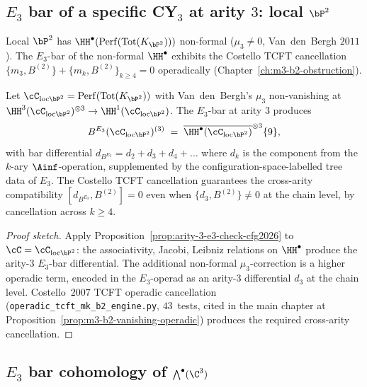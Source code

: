 \subsection*{$E_3$ bar of a specific CY$_3$ at arity $3$: local $\bP^2$}

Local $\bP^2$ has $\HH^\bullet(\mathrm{Perf}(\mathrm{Tot}(K_{\bP^2})))$
non-formal ($\mu_3 \neq 0$, Van~den~Bergh $2011$). The $E_3$-bar of
the non-formal $\HH^\bullet$ exhibits the Costello TCFT cancellation
$\{m_3, B^{(2)}\} + \{m_k, B^{(2)}\}_{k \geq 4} = 0$ operadically
(Chapter~\ref{ch:m3-b2-obstruction}).

\begin{proposition}
\label{prop:e3-bar-local-p2-arity-3-cfg2026}
\ClaimStatusProvedHere
Let $\cC_{\mathrm{loc}\bP^2} = \mathrm{Perf}(\mathrm{Tot}(K_{\bP^2}))$
with Van~den~Bergh's $\mu_3$ non-vanishing at
$\HH^3(\cC_{\mathrm{loc}\bP^2})^{\otimes 3} \to \HH^1(\cC_{\mathrm{loc}\bP^2})$.
The $E_3$-bar at arity $3$ produces
\[
  B^{E_3}(\cC_{\mathrm{loc}\bP^2})^{(3)}
  \;=\; \overline{\HH^\bullet(\cC_{\mathrm{loc}\bP^2})}^{\otimes 3}\{9\},
\]
with bar differential
$d_{B^{E_3}} = d_2 + d_3 + d_4 + \ldots$ where $d_k$ is the component
from the $k$-ary $\Ainf$-operation, supplemented by the
configuration-space-labelled tree data of $E_3$. The Costello TCFT
cancellation guarantees the cross-arity compatibility
$[d_{B^{E_3}}, B^{(2)}] = 0$ even when $\{d_3, B^{(2)}\} \neq 0$ at
the chain level, by cancellation across $k \geq 4$.
\end{proposition}

\begin{proof}[Proof sketch]
Apply Proposition~\textup{\ref{prop:arity-3-e3-check-cfg2026}} to
$\cC = \cC_{\mathrm{loc}\bP^2}$: the associativity, Jacobi, Leibniz
relations on $\HH^\bullet$ produce the arity-$3$ $E_3$-bar
differential. The additional non-formal $\mu_3$-correction is a
higher operadic term, encoded in the $E_3$-operad as an arity-$3$
differential $d_3$ at the chain level. Costello~$2007$ TCFT operadic
cancellation (\texttt{operadic\_tcft\_mk\_b2\_engine.py}, $43$~tests,
cited in the main chapter at Proposition~\textup{\ref{prop:m3-b2-vanishing-operadic}})
produces the required cross-arity cancellation.
\end{proof}

\subsection*{$E_3$ bar cohomology of $\bigwedge^\bullet(\C^3)$}

